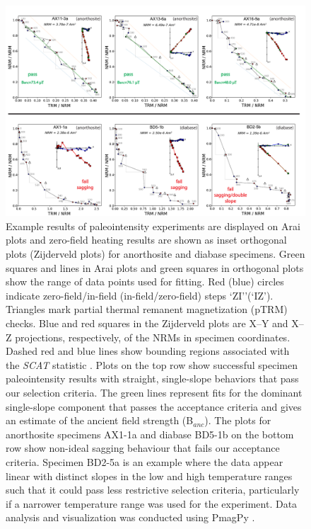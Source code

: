 \begin{figure}
\noindent\includegraphics[width=\textwidth]{figure/Zhang2022/IZZI_examples.pdf}
\centering
\caption[Example Arai plots of paleointensity experiment results]{\footnotesize{Example results of paleointensity experiments are displayed on Arai plots and zero-field heating results are shown as inset orthogonal plots (Zijderveld plots) for anorthosite and diabase specimens. Green squares and lines in Arai plots and green squares in orthogonal plots show the range of data points used for fitting. Red (blue) circles indicate zero-field/in-field (in-field/zero-field) steps `ZI’'(`IZ'). Triangles mark partial thermal remanent magnetization (pTRM) checks. Blue and red squares in the Zijderveld plots are X–Y and X–Z projections, respectively, of the NRMs in specimen coordinates. Dashed red and blue lines show bounding regions associated with the \textit{SCAT} statistic \citep{Shaar2013a}. Plots on the top row show successful specimen paleointensity results with straight, single-slope behaviors that pass our selection criteria. The green lines represent fits for the dominant single-slope component that passes the acceptance criteria and gives an estimate of the ancient field strength (B$_{anc}$). The plots for anorthosite specimens AX1-1a and diabase BD5-1b on the bottom row show non-ideal sagging behaviour that fails our acceptance criteria. Specimen BD2-5a is an example where the data appear linear with distinct slopes in the low and high temperature ranges such that it could pass less restrictive selection criteria, particularly if a narrower temperature range was used for the experiment. Data analysis and visualization was conducted using PmagPy \citep{Tauxe2016a}.}}
\label{fig:IZZI_examples}
\end{figure}

